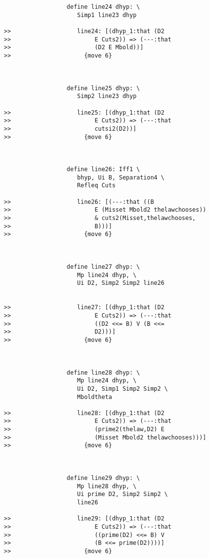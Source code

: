 \documentclass[12pt]{article}
\begin{document}
\begin{verbatim}
                  define line24 dhyp: \
                     Simp1 line23 dhyp

>>                   line24: [(dhyp_1:that (D2
>>                        E Cuts2)) => (---:that
>>                        (D2 E Mbold))]
>>                     {move 6}



                  define line25 dhyp: \
                     Simp2 line23 dhyp

>>                   line25: [(dhyp_1:that (D2
>>                        E Cuts2)) => (---:that
>>                        cutsi2(D2))]
>>                     {move 6}



                  define line26: Iff1 \
                     bhyp, Ui B, Separation4 \
                     Refleq Cuts

>>                   line26: [(---:that ((B
>>                        E (Misset Mbold2 thelawchooses))
>>                        & cuts2(Misset,thelawchooses,
>>                        B)))]
>>                     {move 6}



                  define line27 dhyp: \
                     Mp line24 dhyp, \
                     Ui D2, Simp2 Simp2 line26


>>                   line27: [(dhyp_1:that (D2
>>                        E Cuts2)) => (---:that
>>                        ((D2 <<= B) V (B <<=
>>                        D2)))]
>>                     {move 6}



                  define line28 dhyp: \
                     Mp line24 dhyp, \
                     Ui D2, Simp1 Simp2 Simp2 \
                     Mboldtheta

>>                   line28: [(dhyp_1:that (D2
>>                        E Cuts2)) => (---:that
>>                        (prime2(thelaw,D2) E
>>                        (Misset Mbold2 thelawchooses)))]
>>                     {move 6}



                  define line29 dhyp: \
                     Mp line28 dhyp, \
                     Ui prime D2, Simp2 Simp2 \
                     line26

>>                   line29: [(dhyp_1:that (D2
>>                        E Cuts2)) => (---:that
>>                        ((prime(D2) <<= B) V
>>                        (B <<= prime(D2))))]
>>                     {move 6}




\end{verbatim}
\end{document}
